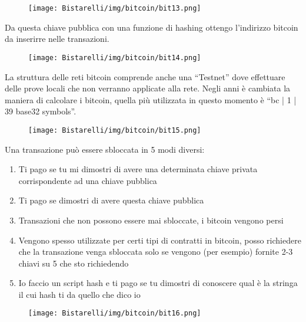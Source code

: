 \begin{figure}[H]
	\centering
    \texttt{[image: Bistarelli/img/bitcoin/bit13.png]}
\end{figure}

Da questa chiave pubblica con una funzione di hashing ottengo l’indirizzo bitcoin da inserirre nelle transazioni.

\begin{figure}[H]
	\centering
    \texttt{[image: Bistarelli/img/bitcoin/bit14.png]}
\end{figure}

La struttura delle reti bitcoin comprende anche una “Testnet” dove effettuare delle prove locali che non verranno
applicate alla rete.
Negli anni è cambiata la maniera di calcolare i bitcoin, quella più utilizzata in questo momento è “bc | 1 | 39
base32 symbols”.

\begin{figure}[H]
	\centering
    \texttt{[image: Bistarelli/img/bitcoin/bit15.png]}
\end{figure}

Una transazione può essere sbloccata in 5 modi diversi:

\begin{enumerate}
    \item Ti pago se tu mi dimostri di avere una determinata chiave privata corrispondente ad una chiave pubblica
    
    \item Ti pago se dimostri di avere questa chiave pubblica
    
    \item Transazioni che non possono essere mai sbloccate, i bitcoin vengono persi
    
    \item  Vengono spesso utilizzate per certi tipi di contratti in bitcoin, posso richiedere che la transazione venga sbloccata solo se vengono (per esempio) fornite 2-3 chiavi su 5 che sto richiedendo
    
    \item Io faccio un script hash e ti pago se tu dimostri di conoscere qual è la stringa il cui hash ti da quello che dico io
\end{enumerate}


\begin{figure}[H]
	\centering
    \texttt{[image: Bistarelli/img/bitcoin/bit16.png]}
\end{figure}

